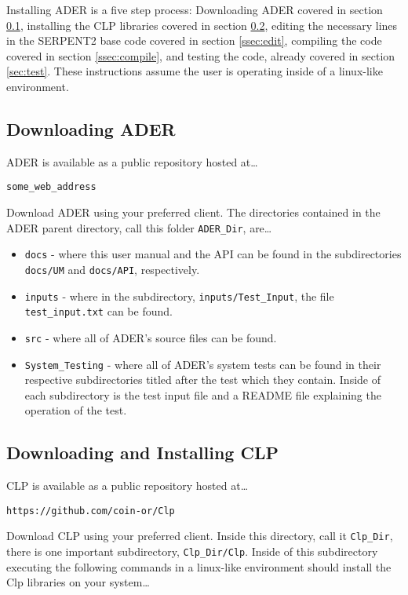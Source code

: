 Installing ADER is a five step process: Downloading ADER covered in section
\ref{ssec:dader}, installing the CLP libraries covered
in section \ref{ssec:dclp}, editing the necessary lines in the SERPENT2
base code covered in section \ref{ssec:edit}, compiling the code covered
in section \ref{ssec:compile}, and testing the code, already covered in
section \ref{sec:test}. These instructions assume the user is operating
inside of a linux-like environment.

\subsection{Downloading ADER}\label{ssec:dader}
ADER is available as a public repository hosted at\ldots
\begin{lstlisting}
some_web_address
\end{lstlisting}

Download ADER using your preferred client. The directories contained in the ADER
parent directory, call this folder \texttt{ADER\_Dir}, are\ldots

\begin{itemize}
\item{\texttt{docs} - where this user manual and the API can be found in the
subdirectories \texttt{docs/UM} and \texttt{docs/API}, respectively.}
\item{\texttt{inputs} - where in the subdirectory, \texttt{inputs/Test\_Input},
the file \texttt{test\_input.txt} can be found.}
\item{\texttt{src} - where all of ADER's source files can be found.}
\item{\texttt{System\_Testing} - where all of ADER's system tests can be found
in their respective subdirectories titled after the test which they contain.
Inside of each subdirectory is the test input file and a README file explaining
the operation of the test.}
\end{itemize}

\subsection{Downloading and Installing CLP}\label{ssec:dclp}
CLP is available as a public repository hosted at\ldots

\begin{lstlisting}
https://github.com/coin-or/Clp
\end{lstlisting}

Download CLP using your preferred client. Inside this directory, call it
\texttt{Clp\_Dir}, there is one important subdirectory, \texttt{Clp\_Dir/Clp}.
Inside of this subdirectory executing the following commands in a linux-like
environment should install the Clp libraries on your system\ldots

